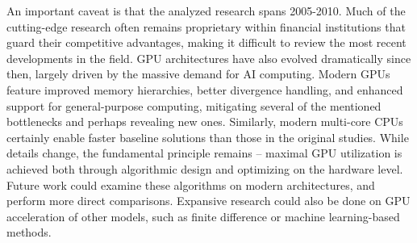 \documentclass[english,12pt,a4paper,pdftex,sci,utf8]{aaltothesis}
\begin{document}
An important caveat is that the analyzed research spans 2005-2010. Much of the cutting-edge research often remains proprietary within financial institutions that guard their competitive advantages, making it difficult to review the most recent developments in the field. GPU architectures have also evolved dramatically since then, largely driven by the massive demand for AI computing. Modern GPUs feature improved memory hierarchies, better divergence handling, and enhanced support for general-purpose computing, mitigating several of the mentioned bottlenecks and perhaps revealing new ones. Similarly, modern multi-core CPUs certainly enable faster baseline solutions than those in the original studies. While details change, the fundamental principle remains -- maximal GPU utilization is achieved both through algorithmic design and optimizing on the hardware level. Future work could examine these algorithms on modern architectures, and perform more direct comparisons. Expansive research could also be done on GPU acceleration of other models, such as finite difference or machine learning-based methods.
\end{document}
